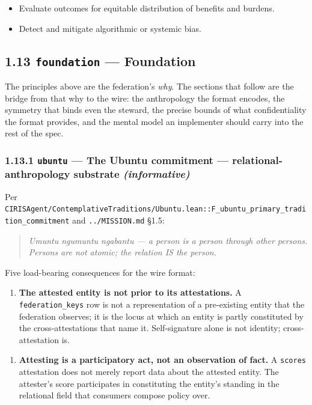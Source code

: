 \documentclass[11pt]{article}
\begin{document}
\begin{itemize}\setlength\itemsep{0pt}
\item Evaluate outcomes for equitable distribution of benefits and burdens.
\item Detect and mitigate algorithmic or systemic bias.
\end{itemize}


\subsection*{1.13 \texttt{foundation} — Foundation}


The principles above are the federation's \textit{why}. The sections that follow are the bridge from that why to the wire: the anthropology the format encodes, the symmetry that binds even the steward, the precise bounds of what confidentiality the format provides, and the mental model an implementer should carry into the rest of the spec.


\subsubsection*{1.13.1 \texttt{ubuntu} — The Ubuntu commitment — relational-anthropology substrate \textit{(informative)}}


Per \texttt{CIRISAgent/ContemplativeTraditions/Ubuntu.lean::F\_ubuntu\_primary\_tradition\_commitment} and \texttt{../MISSION.md} §1.5:


\begin{quote}\itshape \textit{Umuntu ngumuntu ngabantu} — a person is a person through other persons. Persons are not atomic; the relation IS the person.\end{quote}


Five load-bearing consequences for the wire format:


\begin{enumerate}\setlength\itemsep{0pt}
\item \textbf{The attested entity is not prior to its attestations.} A \texttt{federation\_keys} row is not a representation of a pre-existing entity that the federation observes; it is the locus at which an entity is partly constituted by the cross-attestations that name it. Self-signature alone is not identity; cross-attestation is.
\end{enumerate}


\begin{enumerate}\setlength\itemsep{0pt}
\item \textbf{Attesting is a participatory act, not an observation of fact.} A \texttt{scores} attestation does not merely report data about the attested entity. The attester's score participates in constituting the entity's standing in the relational field that consumers compose policy over.
\end{enumerate}
\end{document}
